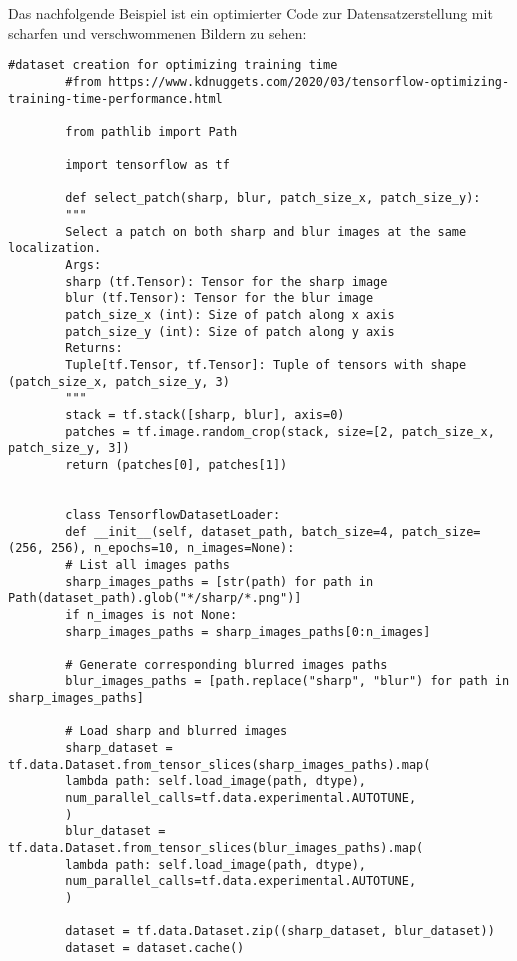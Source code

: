 Das nachfolgende Beispiel ist ein optimierter Code zur Datensatzerstellung mit scharfen und verschwommenen Bildern zu sehen:

\begin{code}
    \begin{lstlisting}[numbers=none]
        #dataset creation for optimizing training time
        #from https://www.kdnuggets.com/2020/03/tensorflow-optimizing-training-time-performance.html
        
        from pathlib import Path
        
        import tensorflow as tf
        
        def select_patch(sharp, blur, patch_size_x, patch_size_y):
        """
        Select a patch on both sharp and blur images at the same localization.
        Args:
        sharp (tf.Tensor): Tensor for the sharp image
        blur (tf.Tensor): Tensor for the blur image
        patch_size_x (int): Size of patch along x axis
        patch_size_y (int): Size of patch along y axis
        Returns:
        Tuple[tf.Tensor, tf.Tensor]: Tuple of tensors with shape (patch_size_x, patch_size_y, 3)
        """
        stack = tf.stack([sharp, blur], axis=0)
        patches = tf.image.random_crop(stack, size=[2, patch_size_x, patch_size_y, 3])
        return (patches[0], patches[1])
        
        
        class TensorflowDatasetLoader:
        def __init__(self, dataset_path, batch_size=4, patch_size=(256, 256), n_epochs=10, n_images=None):
        # List all images paths
        sharp_images_paths = [str(path) for path in Path(dataset_path).glob("*/sharp/*.png")]
        if n_images is not None:
        sharp_images_paths = sharp_images_paths[0:n_images]
        
        # Generate corresponding blurred images paths
        blur_images_paths = [path.replace("sharp", "blur") for path in sharp_images_paths]
        
        # Load sharp and blurred images
        sharp_dataset = tf.data.Dataset.from_tensor_slices(sharp_images_paths).map(
        lambda path: self.load_image(path, dtype),
        num_parallel_calls=tf.data.experimental.AUTOTUNE,
        )
        blur_dataset = tf.data.Dataset.from_tensor_slices(blur_images_paths).map(
        lambda path: self.load_image(path, dtype),
        num_parallel_calls=tf.data.experimental.AUTOTUNE,
        )
        
        dataset = tf.data.Dataset.zip((sharp_dataset, blur_dataset))
        dataset = dataset.cache()
        

\end{lstlisting}
\end{code}
